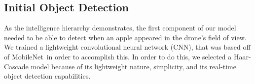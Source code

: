 \subsection{Initial Object Detection}
As the intelligence hierarchy demonstrates, the first component of our model needed to be able to detect when an apple appeared in the drone's field of view. 
We trained a lightweight convolutional neural network (CNN), that was based off of MobileNet~\a in order to accomplish this. 
In order to do this, we selected a Haar-Cascade model because of its lightweight nature, simplicity, and its real-time object detection capabilities. 